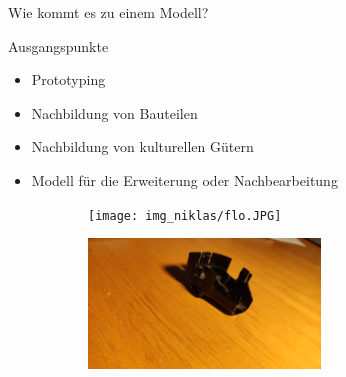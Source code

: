 \begin{frame}{Wie kommt es zu einem Modell?}
    
\begin{block}{Ausgangspunkte}

    \begin{itemize}
        \item Prototyping
        \item Nachbildung von Bauteilen
        \item Nachbildung von kulturellen Gütern
        \item Modell für die Erweiterung oder Nachbearbeitung
    \end{itemize}
    
\begin{figure}[]
    \begin{minipage}{.45\textwidth}
        \begin{figure}[l]
            \centering
            \texttt{[image: img\_niklas/flo.JPG]}
            \label{fig:my_label}
        \end{figure}
    \end{minipage}
    \hfill
    \begin{minipage}{.45\textwidth}
        \begin{figure}[r]
            \centering
            \includegraphics[width=175pt, angle=180]{img_niklas/ersatzteil2.jpg}
            \label{fig:my_label}
        \end{figure}    
    \end{minipage}
\end{figure}

\end{block}
\end{frame}

